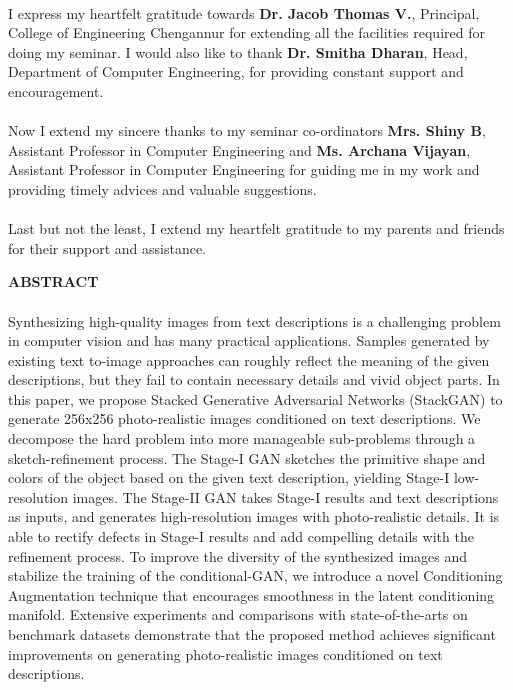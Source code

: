 \documentclass[a4paper,12pt,oneside]{article}
\begin{document}
\paragraph{}
I express my heartfelt gratitude towards \textbf{Dr. Jacob Thomas V.}, Principal, College
of Engineering Chengannur for extending all the facilities required for doing my seminar.
I would also like to thank \textbf{Dr. Smitha Dharan}, Head, Department of Computer
Engineering, for providing constant support and encouragement.
\paragraph{}
Now I extend my sincere thanks to my seminar co-ordinators \textbf{Mrs. Shiny B}, Assistant
Professor in Computer Engineering and \textbf{Ms. Archana Vijayan}, Assistant Professor in Computer Engineering for guiding me in my work and providing timely
advices and valuable suggestions.
\paragraph{}
Last but not the least, I extend my heartfelt gratitude to my parents and friends for
their support and assistance.	

\newpage
\begin{center}
\large{\textbf{ABSTRACT}}
\end{center}
\vspace{4ex}
\paragraph{}
Synthesizing high-quality images from text descriptions is a challenging problem in computer vision and has many practical applications. Samples generated by existing text to-image approaches can roughly reflect the meaning of the given descriptions, but they fail to contain necessary details and vivid object parts. In this paper, we propose Stacked Generative Adversarial Networks (StackGAN) to generate 256x256 photo-realistic images conditioned on text descriptions. We decompose the hard problem into more manageable sub-problems through a sketch-refinement process. The Stage-I GAN sketches the primitive shape and colors of the object based on the given text description, yielding Stage-I low-resolution images. The Stage-II GAN takes Stage-I results and text descriptions as inputs, and generates high-resolution images with photo-realistic details. It is able to rectify defects in Stage-I results and add compelling details with the refinement process. To improve the diversity of the synthesized images and stabilize the training of the conditional-GAN, we introduce a novel Conditioning Augmentation technique that encourages smoothness in the latent conditioning manifold. Extensive experiments and comparisons with state-of-the-arts on benchmark datasets demonstrate that the proposed method achieves significant improvements on generating photo-realistic images conditioned on text descriptions. 
\end{document}
